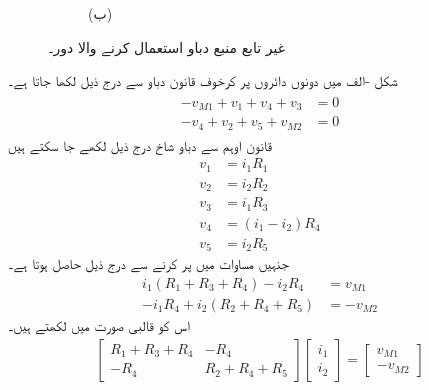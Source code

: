 \begin{figure}
\begin{subfigure}{1\textwidth}
%
\caption*{(ب)}
\end{subfigure}%
\caption{غیر تابع منبع دباو استعمال کرنے والا دور۔}
\label{شکل_جوڑ_آزاد_منبع_دباو_دائری_مثال}
\end{figure}%

شکل -الف میں دونوں دائروں پر کرخوف قانون دباو سے درج ذیل لکھا جاتا ہے۔
\begin{gather}
\begin{aligned}\label{مساوات_جوڑ_دائری_آزاد_منبع_الف}
-v_{M1}+v_1+v_4+v_3&=0\\
-v_4+v_2+v_5+v_{M2}&=0
\end{aligned}
\end{gather}
قانون اوہم سے دباو شاخ درج ذیل لکھے جا سکتے ہیں
\begin{align*}
v_1&=i_1 R_1\\
v_2&=i_2 R_2\\
v_3&=i_1 R_3\\
v_4&=(i_1-i_2)R_4\\
v_5&=i_2 R_5
\end{align*}
جنہیں مساوات  میں پر کرنے سے درج ذیل حاصل ہوتا ہے۔
\begin{align*}
i_1(R_1+R_3+R_4)-i_2 R_4&=v_{M1}\\
-i_1 R_4+i_2(R_2+R_4+R_5)&=-v_{M2}
\end{align*}
اس کو قالبی صورت میں لکھتے ہیں۔
\begin{align}
\begin{bmatrix}
R_1+R_3+R_4 & -R_4\\
-R_4& R_2+R_4+R_5
\end{bmatrix}
\begin{bmatrix}
i_1\\
i_2
\end{bmatrix}
=
\begin{bmatrix}
v_{M1}\\-v_{M2}
\end{bmatrix}
\end{align}

